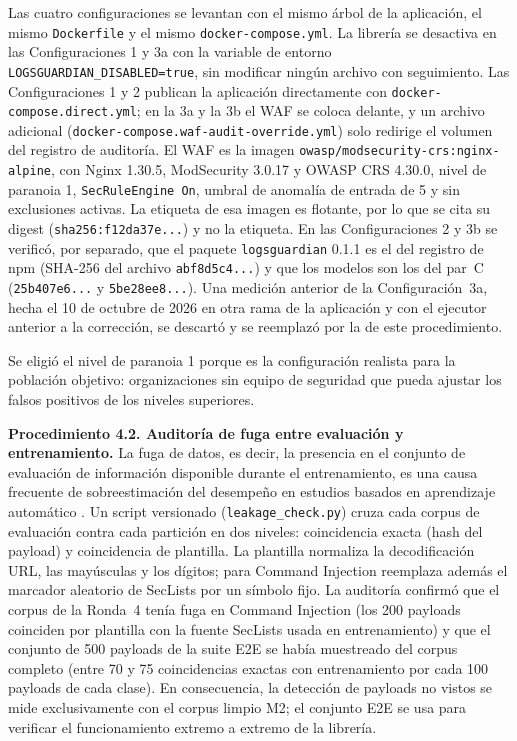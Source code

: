 Las cuatro configuraciones se levantan con el mismo árbol de la aplicación, el mismo
\texttt{Dockerfile} y el mismo \texttt{docker-compose.yml}. La librería se desactiva en las
Configuraciones 1 y 3a con la variable de entorno \texttt{LOGSGUARDIAN\_DISABLED=true}, sin
modificar ningún archivo con seguimiento. Las Configuraciones 1 y 2 publican la aplicación
directamente con \texttt{docker-compose.direct.yml}; en la 3a y la 3b el WAF se coloca delante, y
un archivo adicional (\texttt{docker-compose.waf-audit-override.yml}) solo redirige el volumen del
registro de auditoría. El WAF es la imagen \texttt{owasp/modsecurity-crs:nginx-alpine}, con
Nginx 1.30.5, ModSecurity 3.0.17 y OWASP CRS 4.30.0, nivel de paranoia 1,
\texttt{SecRuleEngine On}, umbral de anomalía de entrada de 5 y sin exclusiones activas. La
etiqueta de esa imagen es flotante, por lo que se cita su digest
(\texttt{sha256:f12da37e...}) y no la etiqueta. En las Configuraciones 2 y 3b se verificó, por
separado, que el paquete \texttt{logsguardian} 0.1.1 es el del registro de npm (SHA-256 del
archivo \texttt{abf8d5c4...}) y que los modelos son los del par~C (\texttt{25b407e6...} y
\texttt{5be28ee8...}). Una medición anterior de la Configuración~3a, hecha el 10 de octubre de 2026
en otra rama de la aplicación y con el ejecutor anterior a la corrección, se descartó y se
reemplazó por la de este procedimiento.

Se eligió el nivel de paranoia 1 porque es la configuración realista para la población
objetivo: organizaciones sin equipo de seguridad que pueda ajustar los falsos positivos de los
niveles superiores.

\textbf{Procedimiento 4.2. Auditoría de fuga entre evaluación y entrenamiento.}
\label{subsec:met-fuga}
La fuga de datos, es decir, la presencia en el conjunto de evaluación de información disponible
durante el entrenamiento, es una causa frecuente de sobreestimación del desempeño en estudios
basados en aprendizaje automático \cite{kapoor2023}. Un script versionado
(\texttt{leakage\_check.py}) cruza cada corpus de evaluación contra cada partición en dos
niveles: coincidencia exacta (hash del payload) y coincidencia de plantilla. La plantilla
normaliza la decodificación URL, las mayúsculas y los dígitos; para Command Injection reemplaza
además el marcador aleatorio de SecLists por un símbolo fijo. La auditoría confirmó que el corpus
de la Ronda~4 tenía fuga en Command Injection (los 200 payloads coinciden por plantilla con la
fuente SecLists usada en entrenamiento) y que el conjunto de 500 payloads de la suite E2E se
había muestreado del corpus completo (entre 70 y 75 coincidencias exactas con entrenamiento por
cada 100 payloads de cada clase). En consecuencia, la detección de payloads no vistos se mide
exclusivamente con el corpus limpio M2; el conjunto E2E se usa para verificar el funcionamiento
extremo a extremo de la librería.


